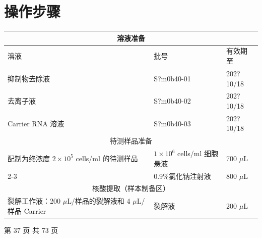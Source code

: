 \documentclass[UTF8,10pt,a4paper,fontset=fandol]{ctexart}
\newcommand{\fieldvalue}[1]{#1}
\newcommand{\handwritten}[1]{#1}
\begin{document}
\section{操作步骤}

\begin{center}
\begin{tabular}{|p{4.0cm}|p{6.0cm}|p{5.0cm}|}
\hline
\multicolumn{3}{|c|}{溶液准备}\\
\hline
溶液 & 批号 & 有效期至\\
\hline
抑制物去除液 &
\fieldvalue{\handwritten{S?m0b40-01}}
&
\fieldvalue{\handwritten{202?10/18}}
\\
\hline
去离子液 &
\fieldvalue{\handwritten{S?m0b40-02}}
&
\fieldvalue{\handwritten{202?10/18}}
\\
\hline
Carrier RNA 溶液 &
\fieldvalue{\handwritten{S?m0b40-03}}
&
\fieldvalue{\handwritten{202?10/18}}
\\
\hline
\multicolumn{3}{|c|}{待测样品准备}\\
\hline
配制为终浓度 $2\times10^{5}$ cells/ml 的待测样品
& $1\times10^{6}$ cells/ml 细胞悬液 &
\fieldvalue{\handwritten{700}} $\mu$L
\\
\cline{2-3}
& 0.9\%氯化钠注射液 &
\fieldvalue{\handwritten{800}} $\mu$L
\\
\hline
\multicolumn{3}{|c|}{核酸提取（样本制备区）}\\
\hline
裂解工作液：200 $\mu$L/样品的裂解液和 4 $\mu$L/样品
Carrier &
裂解液 &
\fieldvalue{\handwritten{200}} $\mu$L
\\
\hline
\end{tabular}
\end{center}

\begin{center}
第 37 页 共 73 页
\end{center}
\end{document}
